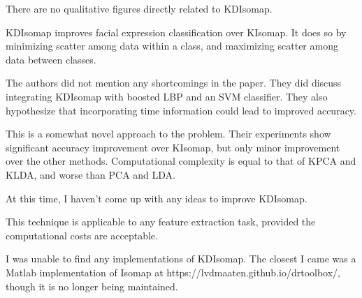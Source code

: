 \documentclass[11pt]{article}
\begin{document}
\begin{description}[leftmargin=0in]
        There are no qualitative figures directly related to KDIsomap.

    \item [Contributions] KDIsomap improves facial expression classification
        over KIsomap. It does so by minimizing scatter among data within a
        class, and maximizing scatter among data between classes.

    \item [Shortcomings] The authors did not mention any shortcomings in the
        paper. They did discuss integrating KDIsomap with boosted LBP and an SVM
        classifier. They also hypothesize that incorporating time information
        could lead to improved accuracy.

    \item [Self Evaluation] This is a somewhat novel approach to the problem.
        Their experiments show significant accuracy improvement over KIsomap,
        but only minor improvement over the other methods. Computational
        complexity is equal to that of KPCA and KLDA, and worse than PCA and
        LDA.

    \item [Improvements] At this time, I haven't come up with any ideas to
        improve KDIsomap.

    \item [Applications] This technique is applicable to any feature extraction
        task, provided the computational costs are acceptable.

    \item [Packages] I was unable to find any implementations of KDIsomap. The
        closest I came was a Matlab implementation of Isomap at
        https://lvdmaaten.github.io/drtoolbox/, though it is no longer being
        maintained.
\end{description}
\end{document}
